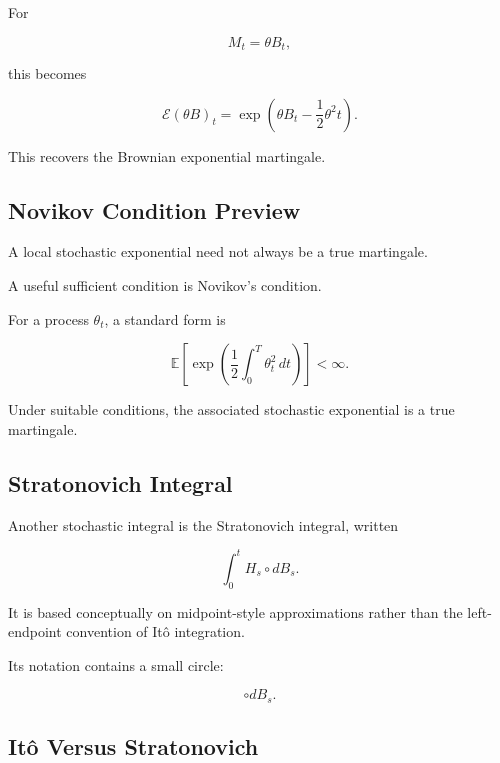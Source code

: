 For

\[
M_t
=
\theta B_t,
\]

this becomes

\[
\boxed{
\mathcal{E}(\theta B)_t
=
\exp
\left(
\theta B_t
-
\frac12\theta^2t
\right).
}
\]

This recovers the Brownian exponential martingale.

\subsection{Novikov Condition Preview}
\label{subsec:novikov-preview}

A local stochastic exponential need not always be a true martingale.

A useful sufficient condition is Novikov's condition.

For a process \(\theta_t\), a standard form is

\[
\boxed{
\mathbb{E}
\left[
\exp
\left(
\frac12
\int_0^T
\theta_t^2\,dt
\right)
\right]
<
\infty.
}
\]

Under suitable conditions, the associated stochastic exponential is a
true martingale.

\subsection{Stratonovich Integral}
\label{subsec:stratonovich-integral}

Another stochastic integral is the Stratonovich integral, written

\[
\boxed{
\int_0^t
H_s
\circ dB_s.
}
\]

It is based conceptually on midpoint-style approximations rather than
the left-endpoint convention of It\^o integration.

Its notation contains a small circle:

\[
\circ dB_s.
\]

\subsection{It\^o Versus Stratonovich}
\label{subsec:ito-versus-stratonovich}

